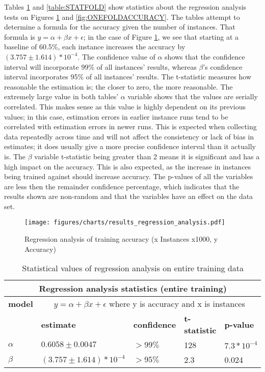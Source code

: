Tables \ref{table:STATENTIRE} and \ref{table:STATFOLD} show statistics about the 
regression analysis tests on Figures \ref{fig:OVERALLTRAININGACCURACY} and 
\ref{fig:ONEFOLDACCURACY}. The tables attempt to determine a formula for the 
accuracy given the number of instances. That formula is $y = \alpha + \beta x + \epsilon$;
in the case of Figure \ref{fig:OVERALLTRAININGACCURACY}, we see that starting at 
a baseline of 60.5\%, each instance increases the accuracy by $(3.757\pm1.614)*10^{-4}$.
The confidence value of $\alpha$ shows that the confidence interval will 
incorporate 99\% of all instances' results, whereas $\beta$'s confidence interval
incorporates 95\% of all instances' results.  The t-statistic measures how 
reasonable the estimation is; the closer to zero, the more reasonable. The 
extremely large value in both tables' $\alpha$ variable shows that the values are 
serially correlated.  This makes sense as this value is highly dependent on its 
previous values; in this case, estimation errors in earlier instance runs tend to 
be correlated with estimation errors in newer runs. This is expected when 
collecting data repeatedly across time and will not affect the consistency or 
lack of bias in estimates; it does usually give a more precise confidence interval 
than it actually is.  The $\beta$ variable t-statistic being greater than 2 means 
it is significant and has a high impact on the accuracy.  This is also expected, 
as the increase in instances being trained against should increase accuracy. The 
p-values of all the variables are less then the remainder confidence percentage, 
which indicates that the results shown are non-random and that the variables have an 
effect on the data set.

\begin{figure}[htpb]
	\begin{center}
		\texttt{[image: figures/charts/results\_regression\_analysis.pdf]}
		\caption{Regression analysis of training accuracy (x Instances x1000, y Accuracy) \label{fig:OVERALLTRAININGACCURACY}}
	\end{center}
\end{figure}

\begin{table}[htpb]
	\begin{tabular}{|l|l|l|l|l|}
		\hline \multicolumn{5}{|c|}{\bf Regression analysis statistics (entire training) } \\ \hline
			{\bf model} & \multicolumn{4}{|c|}{$y = \alpha + \beta x + \epsilon$ where y is accuracy and x is instances} \\ \hline
		            & {\bf estimate} & {\bf confidence} & {\bf t-statistic} & {\bf p-value } \\ \hline
		{\bf $\alpha$}    & $0.6058\pm0.0047$   & $>99\%$            & 128         & $7.3*10^{-4}$ \\ \hline
		{\bf $\beta$}     & $(3.757\pm1.614)*10^{-4}$ & $>95\%$        & 2.3         & 0.024 \\ \hline
		\end{tabular}
		\caption{Statistical values of regression analysis on entire training data}
		\label{table:STATENTIRE}       
\end{table}

